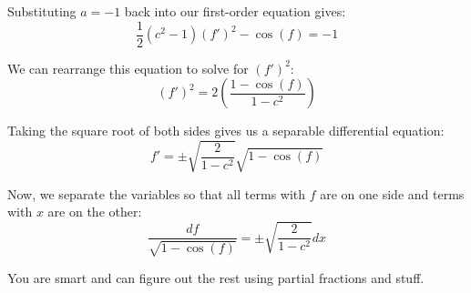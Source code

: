\documentclass[12pt, letterpaper]{article}
\begin{document}
    Substituting $a = -1$ back into our first-order equation gives:
    \[
        \frac{1}{2} (c^2 -1) (f')^2 - \cos(f) = -1
    \]

    We can rearrange this equation to solve for $(f')^2$:
    \[
        (f')^2 = 2\left(\frac{1 - \cos(f)}{1 - c^2}\right)
    \]

    Taking the square root of both sides gives us a separable differential equation:
    \[
        f' = \pm \sqrt{\frac{2}{1 - c^2}} \sqrt{1 - \cos(f)}
    \]

    Now, we separate the variables so that all terms with $f$ are on one side and terms with $x$ are on the other:
    \[
        \frac{df}{\sqrt{1 - \cos(f)}} = \pm \sqrt{\frac{2}{1 - c^2}} dx
    \]

    You are smart and can figure out the rest using partial fractions and stuff.
\end{document}
